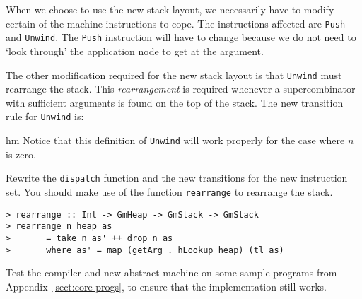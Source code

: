 When we choose to use the new stack layout, we necessarily have to
modify certain of the machine instructions to cope. The instructions
affected are \mbox{\tt Push} and \mbox{\tt Unwind}. The \mbox{\tt Push} instruction will have to
change because we do not need to `look through' the application node to get at the argument.

\gmrule%
{}%
{}

The other modification required for the new stack layout is that
\mbox{\tt Unwind} must rearrange the stack. This {\em
rearrangement} is required whenever a supercombinator
with sufficient arguments is found on the top of the stack. The new
transition rule for \mbox{\tt Unwind} is:

\gmrule%
{%
{h}{m}}%
{}
Notice that this definition of \mbox{\tt Unwind} will work properly for the
case where $n$ is zero.

\begin{exercise}\label{gm:X:mark3stackinst}
Rewrite the \mbox{\tt dispatch} function and the new transitions for the new
instruction set.  You should make use of the function \mbox{\tt rearrange} to
rearrange the stack.
\begin{verbatim}
> rearrange :: Int -> GmHeap -> GmStack -> GmStack
> rearrange n heap as
>       = take n as' ++ drop n as
>       where as' = map (getArg . hLookup heap) (tl as)
\end{verbatim}
%
%
\end{exercise}

\begin{exercise}\label{gm:X:mark3R}
Test the compiler and new abstract machine on some sample programs
from Appendix~\ref{sect:core-progs}, to ensure that the implementation
still works.
\end{exercise}


